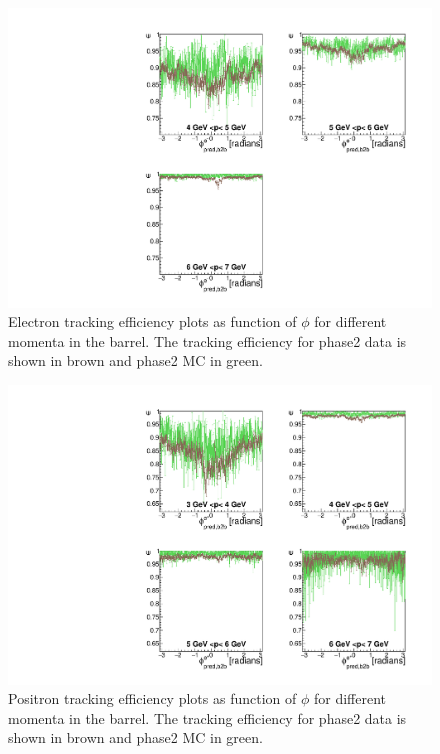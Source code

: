 \documentclass[a4paper,11pt,twosided,final,german,openbib,pdftex,listof=totoc,bibliography=totoc]{scrbook}
\begin{document}
\begin{figure}[!htbp]
	\centering
	\includegraphics[width=\textwidth]{Plots/master/xPMPhiemBarrel}
	\caption[Momentum $\phi$ Electron Barrel Efficiency Phase2]{Electron tracking efficiency plots as function of $\phi$ for different momenta in the barrel. The tracking efficiency for phase2 data is shown in brown and phase2 MC in green.}
	\label{plt:xPMPhiemBarrel}
\end{figure}

\begin{figure}[!htbp]
	\centering
	\includegraphics[width=\textwidth]{Plots/master/xPMPhiepBarrel}
	\caption[Momentum $\phi$ Positron Barrel Efficiency Phase2]{Positron tracking efficiency plots as function of $\phi$ for different momenta in the barrel. The tracking efficiency for phase2 data is shown in brown and phase2 MC in green.}
		\label{plt:xPMPhiepBarrel}
\end{figure}
\end{document}

